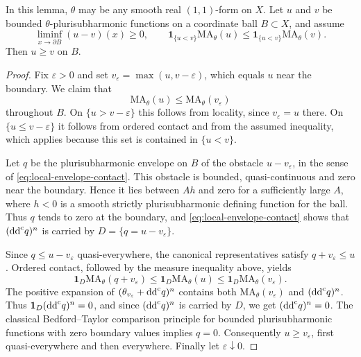 \begin{lemma}\label{lem:big-local-comparison}
In this lemma, $\theta$ may be any smooth real $(1,1)$-form on $X$. Let $u$ and $v$ be bounded $\theta$-plurisubharmonic functions on a coordinate ball $B\subset X$, and assume
\[
 \liminf_{x\to\partial B}(u-v)(x)\geq0,
 \qquad \mathbf1_{\{u<v\}}\mathrm{MA}_\theta(u)\leq
             \mathbf1_{\{u<v\}}\mathrm{MA}_\theta(v).
\]
Then $u\geq v$ on $B$.
\end{lemma}
\begin{proof}
Fix $\varepsilon>0$ and set $v_\varepsilon=\max(u,v-\varepsilon)$, which equals $u$ near the boundary. We claim that
\[
 \mathrm{MA}_\theta(u)\leq\mathrm{MA}_\theta(v_\varepsilon)
\]
throughout $B$. On $\{u>v-\varepsilon\}$ this follows from locality, since $v_\varepsilon=u$ there. On $\{u\leq v-\varepsilon\}$ it follows from ordered contact and from the assumed inequality, which applies because this set is contained in $\{u<v\}$.

Let $q$ be the plurisubharmonic envelope on $B$ of the obstacle $u-v_\varepsilon$, in the sense of \eqref{eq:local-envelope-contact}. This obstacle is bounded, quasi-continuous and zero near the boundary. Hence it lies between $Ah$ and zero for a sufficiently large $A$, where $h<0$ is a smooth strictly plurisubharmonic defining function for the ball. Thus $q$ tends to zero at the boundary, and \eqref{eq:local-envelope-contact} shows that $(\mathrm{dd}^{\mathrm{c}} q)^n$ is carried by $D=\{q=u-v_\varepsilon\}$.

Since $q\leq u-v_\varepsilon$ quasi-everywhere, the canonical representatives satisfy $q+v_\varepsilon\leq u$. Ordered contact, followed by the measure inequality above, yields
\[
 \mathbf1_D\mathrm{MA}_\theta(q+v_\varepsilon)
 \leq\mathbf1_D\mathrm{MA}_\theta(u)
 \leq\mathbf1_D\mathrm{MA}_\theta(v_\varepsilon).
\]
The positive expansion of $(\theta_{v_\varepsilon}+\mathrm{dd}^{\mathrm{c}} q)^n$ contains both $\mathrm{MA}_\theta(v_\varepsilon)$ and $(\mathrm{dd}^{\mathrm{c}} q)^n$. Thus $\mathbf1_D(\mathrm{dd}^{\mathrm{c}} q)^n=0$, and since $(\mathrm{dd}^{\mathrm{c}} q)^n$ is carried by $D$, we get $(\mathrm{dd}^{\mathrm{c}} q)^n=0$. The classical Bedford--Taylor comparison principle for bounded plurisubharmonic functions with zero boundary values implies $q=0$. Consequently $u\geq v_\varepsilon$, first quasi-everywhere and then everywhere. Finally let $\varepsilon\downarrow0$.
\end{proof}

